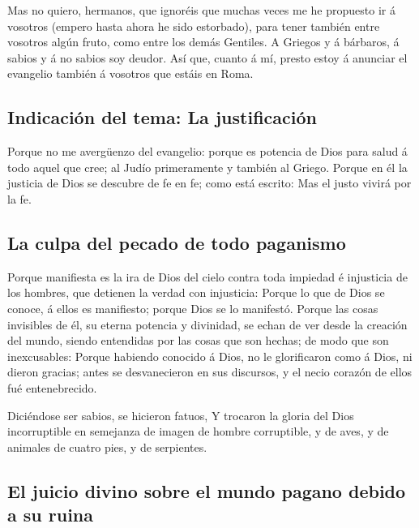  Mas no quiero, hermanos, que ignoréis que muchas veces
me he propuesto ir á vosotros (empero hasta ahora he sido estorbado),
para tener también entre vosotros algún fruto, como entre los demás
Gentiles.  A Griegos y á bárbaros, á sabios y á no sabios
soy deudor.  Así que, cuanto á mí, presto estoy á
anunciar el evangelio también á vosotros que estáis en Roma.

\hypertarget{indicaciuxf3n-del-tema-la-justificaciuxf3n}{%
\subsection{Indicación del tema: La
justificación}\label{indicaciuxf3n-del-tema-la-justificaciuxf3n}}

 Porque no me avergüenzo del evangelio: porque es
potencia de Dios para salud á todo aquel que cree; al Judío primeramente
y también al Griego.  Porque en él la justicia de Dios se
descubre de fe en fe; como está escrito: Mas el justo vivirá por la fe.

\hypertarget{la-culpa-del-pecado-de-todo-paganismo}{%
\subsection{La culpa del pecado de todo
paganismo}\label{la-culpa-del-pecado-de-todo-paganismo}}

 Porque manifiesta es la ira de Dios del cielo contra
toda impiedad é injusticia de los hombres, que detienen la verdad con
injusticia:  Porque lo que de Dios se conoce, á ellos es
manifiesto; porque Dios se lo manifestó.  Porque las
cosas invisibles de él, su eterna potencia y divinidad, se echan de ver
desde la creación del mundo, siendo entendidas por las cosas que son
hechas; de modo que son inexcusables:  Porque habiendo
conocido á Dios, no le glorificaron como á Dios, ni dieron gracias;
antes se desvanecieron en sus discursos, y el necio corazón de ellos fué
entenebrecido.

 Diciéndose ser sabios, se hicieron fatuos,
 Y trocaron la gloria del Dios incorruptible en semejanza
de imagen de hombre corruptible, y de aves, y de animales de cuatro
pies, y de serpientes.

\hypertarget{el-juicio-divino-sobre-el-mundo-pagano-debido-a-su-ruina}{%
\subsection{El juicio divino sobre el mundo pagano debido a su
ruina}\label{el-juicio-divino-sobre-el-mundo-pagano-debido-a-su-ruina}}

